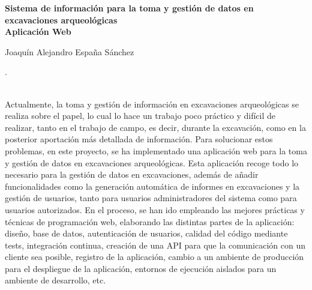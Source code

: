 \thispagestyle{empty}
\cleardoublepage
\begin{center}
{\large\bfseries Sistema de información para la toma y gestión de datos en excavaciones arqueológicas \\ Aplicación Web }\\
\end{center}
\begin{center}
	Joaquín Alejandro España Sánchez\\
\end{center}


\vspace{0.5cm}
. \\
							     
\vspace{0.7cm}

 \\

Actualmente, la toma y gestión de información en excavaciones arqueológicas se realiza sobre el papel, lo cual lo hace un trabajo poco práctico y difícil de realizar, tanto en el trabajo
de campo, es decir, durante la excavación, como en la posterior aportación más detallada de información. Para solucionar estos problemas, en este proyecto, se ha implementado una aplicación
web para la toma y gestión de datos en excavaciones arqueológicas. Esta aplicación recoge todo lo necesario para la gestión de datos en excavaciones, además de añadir funcionalidades
como la generación automática de informes en excavaciones y la gestión de usuarios, tanto para usuarios administradores del sistema como para usuarios autorizados. En el proceso, se han
ido empleando las mejores prácticas y técnicas de programación web, elaborando las distintas partes de la aplicación: diseño, base de datos, autenticación de usuarios, calidad del código
mediante tests, integración continua, creación de una API para que la comunicación con un cliente sea posible, registro de la aplicación, cambio a un ambiente de producción para el despliegue
de la aplicación, entornos de ejecución aislados para un ambiente de desarrollo, etc.


